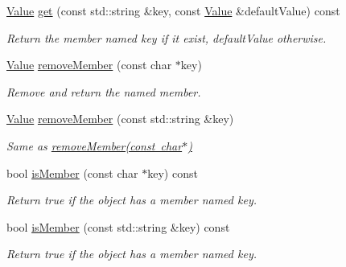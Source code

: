 \begin{DoxyCompactItemize}
\mbox{\label{class_json_1_1_value_af17414293cffc973cee466372d8dc151}} 
\mbox{\hyperlink{class_json_1_1_value}{Value}} \mbox{\hyperlink{class_json_1_1_value_af17414293cffc973cee466372d8dc151}{get}} (const std\+::string \&key, const \mbox{\hyperlink{class_json_1_1_value}{Value}} \&default\+Value) const
\begin{DoxyCompactList}\small\item\em Return the member named key if it exist, default\+Value otherwise. \end{DoxyCompactList}\item 
\mbox{\hyperlink{class_json_1_1_value}{Value}} \mbox{\hyperlink{class_json_1_1_value_aa52f7873b95d29627d6e83ba96f69aaa}{remove\+Member}} (const char $\ast$key)
\begin{DoxyCompactList}\small\item\em Remove and return the named member. \end{DoxyCompactList}\item 
\mbox{\label{class_json_1_1_value_ae1f95f7ca3906e6bcc2a7be93210ecba}} 
\mbox{\hyperlink{class_json_1_1_value}{Value}} \mbox{\hyperlink{class_json_1_1_value_ae1f95f7ca3906e6bcc2a7be93210ecba}{remove\+Member}} (const std\+::string \&key)
\begin{DoxyCompactList}\small\item\em Same as \mbox{\hyperlink{class_json_1_1_value_aa52f7873b95d29627d6e83ba96f69aaa}{remove\+Member(const char$\ast$)}} \end{DoxyCompactList}\item 
\mbox{\label{class_json_1_1_value_ad6d4df2227321bab05e86667609a7fad}} 
bool \mbox{\hyperlink{class_json_1_1_value_ad6d4df2227321bab05e86667609a7fad}{is\+Member}} (const char $\ast$key) const
\begin{DoxyCompactList}\small\item\em Return true if the object has a member named key. \end{DoxyCompactList}\item 
\mbox{\label{class_json_1_1_value_a0a098bdc6ce5ade1722584c22297adac}} 
bool \mbox{\hyperlink{class_json_1_1_value_a0a098bdc6ce5ade1722584c22297adac}{is\+Member}} (const std\+::string \&key) const
\begin{DoxyCompactList}\small\item\em Return true if the object has a member named key. \end{DoxyCompactList}\item 

\end{DoxyCompactItemize}
